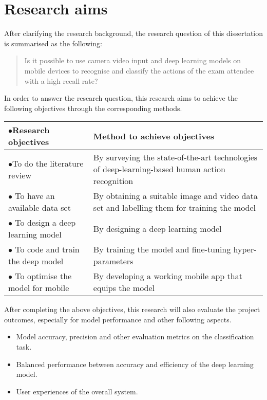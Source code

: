 \section{Research aims}
\label{sec:Research aims}
After clarifying the research background, the research question of this dissertation is summarised as the following:

\begin{quote}
    Is it possible to use camera video input and deep learning models on mobile devices to recognise and classify the actions of the exam attendee with a high recall rate?
\end{quote}

In order to answer the research question, this research aims to achieve the following objectives through the corresponding methods.

\begin{longtable}{>{\hspace*{-0.3cm}$\bullet$\hspace*{0.2cm}}p{}p{}}
\textbf{Research objectives} & \textbf{Method to achieve objectives} \\ \hline
To do the literature review & By surveying the state-of-the-art technologies of deep-learning-based human action recognition \\ \hline
To have an available data set & By obtaining a suitable image and video data set and labelling them for training the model \\ \hline
To design a deep learning model & By designing a deep learning model \\ \hline
To code and train the deep model & By training the model and fine-tuning hyper-parameters \\ \hline
To optimise the model for mobile & By developing a working mobile app that equips the model \\ 
\end{longtable}

After completing the above objectives, this research will also evaluate the project outcomes, especially for model performance and other following aspects.

\begin{itemize}
    \item Model accuracy, precision and other evaluation metrics on the classification task.
    \item Balanced performance between accuracy and efficiency of the deep learning model.
    \item User experiences of the overall system.
\end{itemize}
